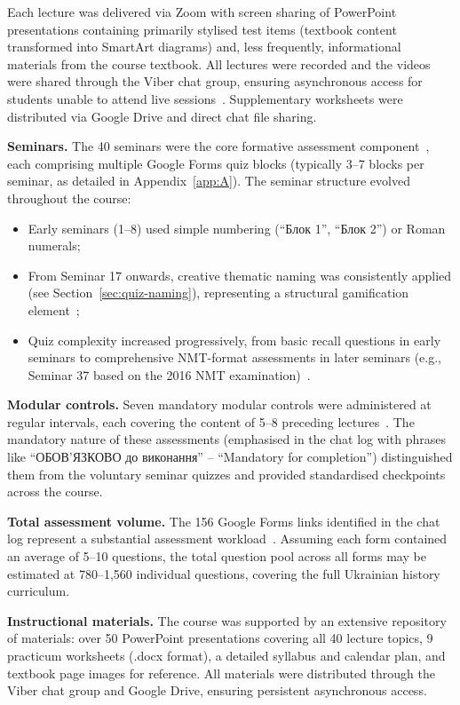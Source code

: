 Each lecture was delivered via Zoom with screen sharing of PowerPoint presentations containing primarily stylised test items (textbook content transformed into SmartArt diagrams) and, less frequently, informational materials from the course textbook. All lectures were recorded and the videos were shared through the Viber chat group, ensuring asynchronous access for students unable to attend live sessions~\cite{Bonwell1991, Tamim2011}. Supplementary worksheets were distributed via Google Drive and direct chat file sharing.

\textbf{Seminars.} The 40 seminars were the core formative assessment component~\cite{Hattie2009, Hickey2015}, each comprising multiple Google Forms quiz blocks (typically 3--7 blocks per seminar, as detailed in Appendix~\ref{app:A}). The seminar structure evolved throughout the course:

\begin{itemize}
\item Early seminars (1--8) used simple numbering (``Блок 1'', ``Блок 2'') or Roman numerals;
\item From Seminar 17 onwards, creative thematic naming was consistently applied (see Section~\ref{sec:quiz-naming}), representing a structural gamification element~\cite{SEABORN201514, Sailer2017};
\item Quiz complexity increased progressively, from basic recall questions in early seminars to comprehensive NMT-format assessments in later seminars (e.g., Seminar 37 based on the 2016 NMT examination)~\cite{Clark2016}.
\end{itemize}

\textbf{Modular controls.} Seven mandatory modular controls were administered at regular intervals, each covering the content of 5--8 preceding lectures~\cite{Hattie2009}. The mandatory nature of these assessments (emphasised in the chat log with phrases like ``ОБОВ'ЯЗКОВО до виконання'' -- ``Mandatory for completion'') distinguished them from the voluntary seminar quizzes and provided standardised checkpoints across the course.

\textbf{Total assessment volume.} The 156 Google Forms links identified in the chat log represent a substantial assessment workload~\cite{Hattie2009}. Assuming each form contained an average of 5--10 questions, the total question pool across all forms may be estimated at 780--1,560 individual questions, covering the full Ukrainian history curriculum.

\textbf{Instructional materials.} The course was supported by an extensive repository of materials: over 50 PowerPoint presentations covering all 40 lecture topics, 9 practicum worksheets (.docx format), a detailed syllabus and calendar plan, and textbook page images for reference. All materials were distributed through the Viber chat group and Google Drive, ensuring persistent asynchronous access.

